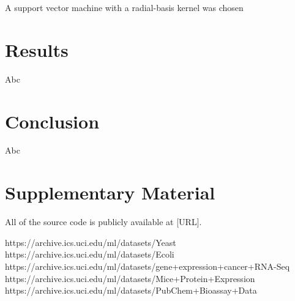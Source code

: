 \documentclass{article}
\begin{document}
  A support vector machine with a radial-basis kernel was chosen

\section{Results}
  Abc

\section{Conclusion}
  Abc

\section{Supplementary Material}
All of the source code is publicly available at [URL].

https://archive.ics.uci.edu/ml/datasets/Yeast
https://archive.ics.uci.edu/ml/datasets/Ecoli
https://archive.ics.uci.edu/ml/datasets/gene+expression+cancer+RNA-Seq
https://archive.ics.uci.edu/ml/datasets/Mice+Protein+Expression
https://archive.ics.uci.edu/ml/datasets/PubChem+Bioassay+Data
\end{document}
